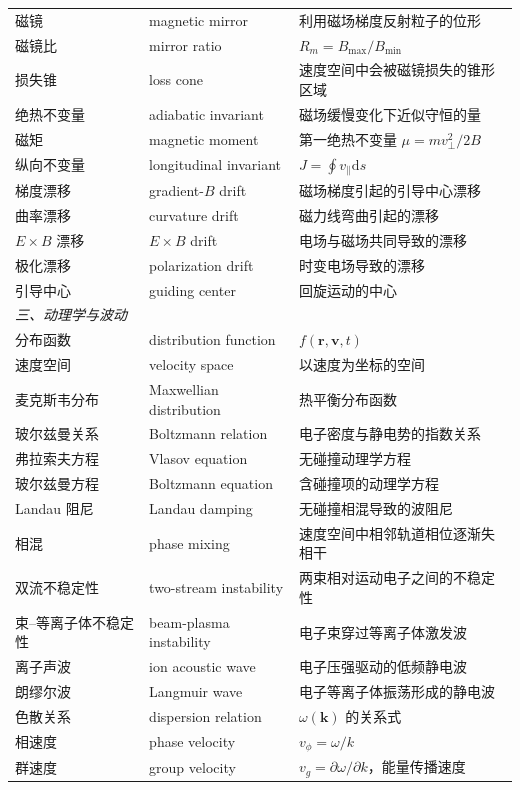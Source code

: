 \documentclass[12pt,a4paper,openany,oneside]{book}
\newcommand{\diff}{\mathrm{d}}
\newcommand{\vect}[1]{\bm{#1}}
\begin{document}
{\begin{longtable}{@{}p{4.2cm}p{5.6cm}p{4.8cm}@{}}
磁镜 & magnetic mirror & 利用磁场梯度反射粒子的位形 \\
磁镜比 & mirror ratio & $R_m = B_{\max}/B_{\min}$ \\
损失锥 & loss cone & 速度空间中会被磁镜损失的锥形区域 \\
绝热不变量 & adiabatic invariant & 磁场缓慢变化下近似守恒的量 \\
磁矩 & magnetic moment & 第一绝热不变量 $\mu = mv_\perp^2/2B$ \\
纵向不变量 & longitudinal invariant & $J = \oint v_\parallel\diff s$ \\
梯度漂移 & gradient-$B$ drift & 磁场梯度引起的引导中心漂移 \\
曲率漂移 & curvature drift & 磁力线弯曲引起的漂移 \\
$E\times B$ 漂移 & $E\times B$ drift & 电场与磁场共同导致的漂移 \\
极化漂移 & polarization drift & 时变电场导致的漂移 \\
引导中心 & guiding center & 回旋运动的中心 \\
\multicolumn{3}{l}{\textit{三、动理学与波动}} \\
\midrule
分布函数 & distribution function & $f(\vect{r},\vect{v},t)$ \\
速度空间 & velocity space & 以速度为坐标的空间 \\
麦克斯韦分布 & Maxwellian distribution & 热平衡分布函数 \\
玻尔兹曼关系 & Boltzmann relation & 电子密度与静电势的指数关系 \\
弗拉索夫方程 & Vlasov equation & 无碰撞动理学方程 \\
玻尔兹曼方程 & Boltzmann equation & 含碰撞项的动理学方程 \\
Landau 阻尼 & Landau damping & 无碰撞相混导致的波阻尼 \\
相混 & phase mixing & 速度空间中相邻轨道相位逐渐失相干 \\
双流不稳定性 & two-stream instability & 两束相对运动电子之间的不稳定性 \\
束--等离子体不稳定性 & beam-plasma instability & 电子束穿过等离子体激发波 \\
离子声波 & ion acoustic wave & 电子压强驱动的低频静电波 \\
朗缪尔波 & Langmuir wave & 电子等离子体振荡形成的静电波 \\
色散关系 & dispersion relation & $\omega(\vect{k})$ 的关系式 \\
相速度 & phase velocity & $v_\phi = \omega/k$ \\
群速度 & group velocity & $v_g = \partial\omega/\partial k$，能量传播速度 \\

\end{longtable}}
\end{document}
